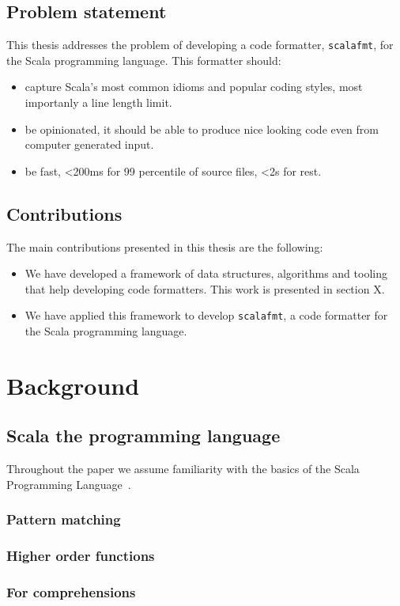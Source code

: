 \documentclass[11pt,a4paper]{article}
\begin{document}
\subsection{Problem statement}
This thesis addresses the problem of developing a code formatter, \texttt{scalafmt}, for the Scala programming language.
This formatter should:
\begin{itemize}
  \item capture Scala's most common idioms and popular coding styles, most importanly a line length limit.
  \item be opinionated, it should be able to produce nice looking code even from computer generated input.
  \item be fast, <200ms for 99 percentile of source files, <2s for rest.
\end{itemize}

\subsection{Contributions}
The main contributions presented in this thesis are the following:
\begin{itemize}
    \item We have developed a framework of data structures, algorithms and tooling that help
      developing code formatters. This work is presented in section X.
    \item We have applied this framework to develop \texttt{scalafmt}, a code
      formatter for the Scala programming language.
\end{itemize}

\section{Background}
\subsection{Scala the programming language}
Throughout the paper we assume familiarity with the basics of the Scala
Programming Language~\autocite{odersky_scala_2004}.
\subsubsection{Pattern matching}
\subsubsection{Higher order functions}
\subsubsection{For comprehensions}
\end{document}

